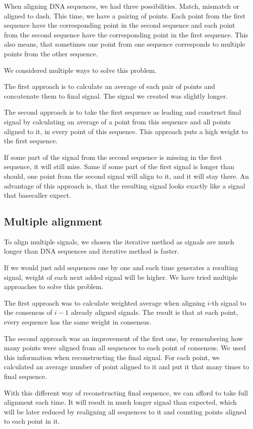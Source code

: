 When aligning DNA sequences, we had three possibilities. Match, mismatch or aligned to dash. 
This time, we have a pairing of points. Each point from the first sequence have the corresponding point
in the second sequence and each point from the second sequence have the corresponding point
in the first sequence. This also means, that sometimes one point from one sequence corresponds to multiple points from the other sequence.

We considered multiple ways to solve this problem.

The first approach is to calculate an average of each pair of points and concatenate them to final signal. The signal we created
was slightly longer.

The second approach is to take the first sequence as leading and construct final signal by calculating an average of a point from this sequence and all points aligned to it, in every point of this sequence. 
This approach puts a high weight to the first sequence.

If some part of the signal from the second sequence is missing in the first sequence, it will still miss.
Same if some part of the first signal is longer than should, one point from the second signal will align to it, and it will stay there.
An advantage of this approach is, that the resulting signal looks exactly like a signal that basecaller expect.

\subsection{Multiple alignment}

To align multiple signals, we chosen the iterative method as signals are much longer than DNA sequences and iterative method is faster.

If we would just add sequences one by one and each time generates a resulting signal, weight of each next added signal will be higher.
We have tried multiple approaches to solve this problem.

The first approach was to calculate weighted average when aligning $i$-th signal to the consensus of $i-1$ already aligned signals. 
The result is that at each point, every sequence has the same weight in consensus.

The second approach was an improvement of the first one, by remembering how many points were aligned from all sequences to each point of consensus. We used
this information when reconstructing the final signal. For each point, we calculated an average number of point aligned to it and put it that many times to final sequence.

With this different way of reconstructing final sequence, we can afford to take full alignment each time. 
It will result in much longer signal than expected, which will be later reduced by realigning all sequences to it and counting 
points aligned to each point in it.
